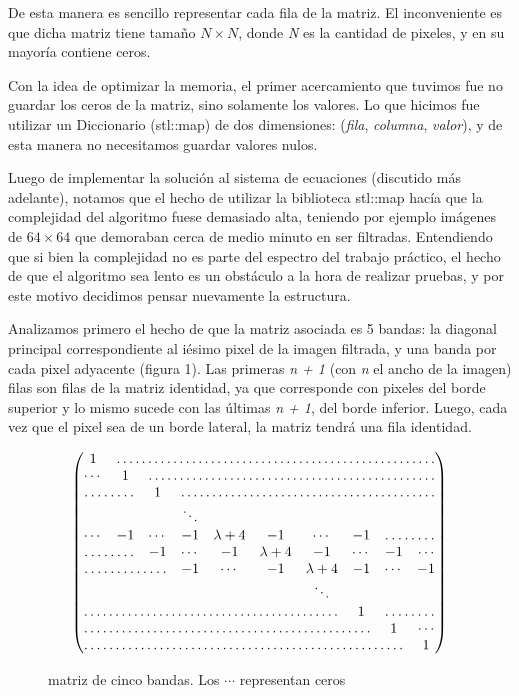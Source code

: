 \documentclass[a4paper]{article}
\begin{document}
De esta manera es sencillo representar cada fila de la matriz. El inconveniente es que dicha matriz tiene tamaño $N \times N$, donde \textit{N} es la cantidad de pixeles, y en su mayoría contiene ceros.

Con la idea de optimizar la memoria, el primer acercamiento que tuvimos fue no guardar los ceros de la matriz, sino solamente los valores. Lo que hicimos fue utilizar un Diccionario (stl::map) de dos dimensiones: (\textit{fila}, \textit{columna}, \textit{valor}), y de esta manera no necesitamos guardar valores nulos. \vspace{1em}

Luego de implementar la solución al sistema de ecuaciones (discutido más adelante), notamos que el hecho de utilizar la biblioteca stl::map hacía que la complejidad del algoritmo fuese demasiado alta, teniendo por ejemplo imágenes de $64 \times 64$ que demoraban cerca de medio minuto en ser filtradas. Entendiendo que si bien la complejidad no es parte del espectro del trabajo práctico, el hecho de que el algoritmo sea lento es un obstáculo a la hora de realizar pruebas, y por este motivo decidimos pensar nuevamente la estructura. \vspace{1em}

Analizamos primero el hecho de que la matriz asociada es 5 bandas: la diagonal principal correspondiente al iésimo pixel de la imagen filtrada, y una banda por cada pixel adyacente (figura 1).
Las primeras \textit{n + 1} (con \textit{n} el ancho de la imagen) filas son filas de la matriz identidad, ya que corresponde con pixeles del borde superior y lo mismo sucede con las últimas \textit{n + 1}, del borde inferior. Luego, cada vez que el pixel sea de un borde lateral, la matriz tendrá una fila identidad.

\begin{figure}[H]
$$
 \begin{pmatrix}
  1 & \hdotsfor{9} \\  
  \cdots & 1 & \hdotsfor{8} \\
  \hdotsfor{2} & 1 & \hdotsfor{7} \\  
  & & & \ddots \\
  \cdots &-1 & \cdots & -1 & \lambda + 4 & -1 & \cdots & -1 & \hdotsfor{2} \\
  \hdotsfor{2} & -1 & \cdots & -1 & \lambda + 4 & -1 & \cdots & -1 & \cdots \\
  \hdotsfor{3} & -1 & \cdots & -1 & \lambda + 4 & -1 & \cdots & -1 \\
  & & & & & & \ddots \\
  \hdotsfor{7} & 1 & \hdotsfor{2} \\
  \hdotsfor{8} & 1 & \cdots \\
  \hdotsfor{9} & 1 \\
 \end{pmatrix}
$$
 \caption{matriz de cinco bandas. Los $\cdots$ representan ceros}
\end{figure}
\end{document}
